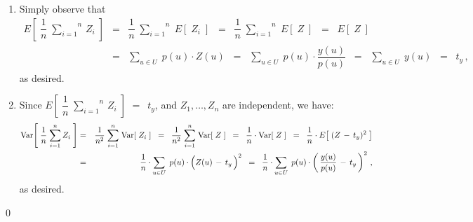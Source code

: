\proof
\begin{enumerate}
\item
	Simply observe that
	\begin{eqnarray*}
	E\!\left[\;\dfrac{1}{n}\;\overset{n}{\underset{i=1}{\sum}}\,Z_{i}\;\right]
	&=&
		\dfrac{1}{n}\;\overset{n}{\underset{i=1}{\sum}}\;E\!\left[\;Z_{i}\;\right]
	\;\; = \;\;
		\dfrac{1}{n}\;\overset{n}{\underset{i=1}{\sum}}\;E\!\left[\;Z\;\right]
	\;\; = \;\;
		E\!\left[\;Z\;\right]
	\\
	&=&
		\underset{u \in U}{\sum}\; p(u) \cdot Z(u)
	\;\; = \;\;
		\underset{u \in U}{\sum}\; p(u) \cdot \dfrac{y(u)}{p(u)}
	\;\; = \;\;
		\underset{u \in U}{\sum}\; y(u)
	\;\; = \;\;
		t_{y}\,,
	\end{eqnarray*}
	as desired.
\item
	Since \;$E\!\left[\;\dfrac{1}{n}\;\overset{n}{\underset{i=1}{\sum}}\,Z_{i}\;\right]$ $=$\, $t_{y}$,\;
	and \;$Z_{1}, \ldots, Z_{n}$\; are independent, we have:
	\begin{eqnarray*}
	\Var\!\left[\;\dfrac{1}{n}\;\overset{n}{\underset{i=1}{\sum}}\,Z_{i}\;\right]
	&=&
		\dfrac{1}{n^{2}}\;\overset{n}{\underset{i=1}{\sum}}\;\Var\!\left[\;Z_{i}\;\right]
	\;\; = \;\;
		\dfrac{1}{n^{2}}\;\overset{n}{\underset{i=1}{\sum}}\;\Var\!\left[\;Z\;\right]
	\;\; = \;\;
		\dfrac{1}{n}\cdot\Var\!\left[\;Z\;\right]
	\;\; = \;\;
		\dfrac{1}{n} \cdot E\!\left[\;(Z\,-\,t_{y})^{2}\;\right]	
	\\
	&=&
		\dfrac{1}{n}\cdot
		\underset{u \in U}{\sum}\;\, p(u)\cdot\left(\overset{{\color{white}.}}{Z}(u)\,-\,t_{y}\,\right)^{2}
	\;\; = \;\;
		\dfrac{1}{n}\cdot
		\underset{u \in U}{\sum}\;\, p(u)\cdot\left(\,\dfrac{y(u)}{p(u)}\,-\,t_{y}\,\right)^{2}\,,
	\end{eqnarray*}
	as desired.
\end{enumerate}
\qed


\renewcommand{\theenumi}{\roman{enumi}}
\renewcommand{\labelenumi}{\textnormal{(\theenumi)}$\;\;$}

